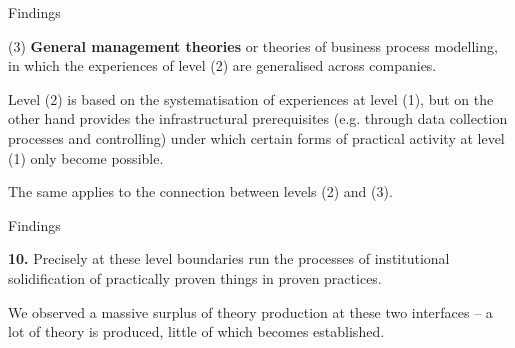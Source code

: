 \documentclass{beamer}
\begin{document}
\begin{frame}{Findings}

(3) \textbf{General management theories} or theories of business process
modelling, in which the experiences of level (2) are generalised across
companies.

Level (2) is based on the systematisation of experiences at level (1), but on
the other hand provides the infrastructural prerequisites (e.g. through data
collection processes and controlling) under which certain forms of practical
activity at level (1) only become possible.

The same applies to the connection between levels (2) and (3).

\end{frame}
\begin{frame}{Findings}

\textbf{10.}  Precisely at these level boundaries run the processes of
institutional solidification of practically proven things in proven practices.

We observed a massive surplus of theory production at these two interfaces --
a lot of theory is produced, little of which becomes established.

\end{frame}
\end{document}
